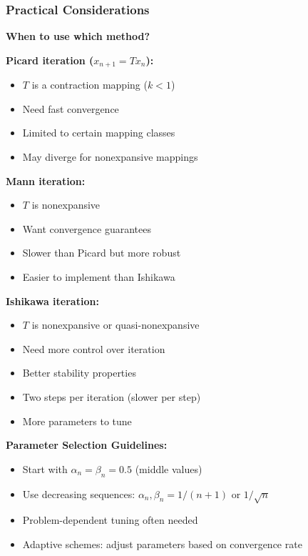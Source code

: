 \documentclass[aspectratio=169,10pt]{beamer}
\begin{document}
\begin{frame}
\frametitle{Practical Considerations}

\textbf{When to use which method?}

\vspace{0.2cm}

\textbf{Picard iteration ($x_{n+1} = Tx_n$):}
\begin{itemize}
    \item [+] $T$ is a contraction mapping ($k < 1$)
    \item [+] Need fast convergence
    \item [-] Limited to certain mapping classes
    \item [-] May diverge for nonexpansive mappings
\end{itemize}

\vspace{0.2cm}

\textbf{Mann iteration:}
\begin{itemize}
    \item [+] $T$ is nonexpansive
    \item [+] Want convergence guarantees
    \item [~] Slower than Picard but more robust
    \item [+] Easier to implement than Ishikawa
\end{itemize}

\vspace{0.2cm}

\textbf{Ishikawa iteration:}
\begin{itemize}
    \item [+] $T$ is nonexpansive or quasi-nonexpansive
    \item [+] Need more control over iteration
    \item [+] Better stability properties
    \item [~] Two steps per iteration (slower per step)
    \item [+] More parameters to tune
\end{itemize}

\vspace{0.2cm}

\textbf{Parameter Selection Guidelines:}
\begin{itemize}
    \item Start with $\alpha_n = \beta_n = 0.5$ (middle values)
    \item Use decreasing sequences: $\alpha_n, \beta_n = 1/(n+1)$ or $1/\sqrt{n}$
    \item Problem-dependent tuning often needed
    \item Adaptive schemes: adjust parameters based on convergence rate
\end{itemize}

\end{frame}
\end{document}
